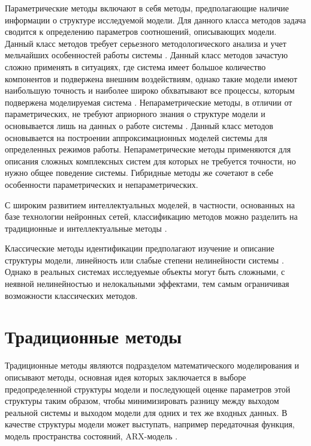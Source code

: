 Параметрические методы включают в себя методы, предполагающие наличие
информации о структуре исследуемой модели. Для данного класса методов задача
сводится к определению параметров соотношений, описывающих модели. Данный класс
методов требует серьезного методологического анализа и учет мельчайших
особенностей работы системы \cite{bib:ident:simulation}. Данный класс методов
зачастую сложно применять в
ситуациях, где система имеет большое количество компонентов и подвержена
внешним воздействиям, однако такие модели имеют наибольшую точность и наиболее
широко обхватывают все процессы, которым подвержена моделируемая система
\cite{bib:ident:model:klassif}. Непараметрические методы, в отличии от параметрических,
не требуют априорного знания о структуре модели и основывается лишь на данных о
работе системы \cite{bib:ident:arrays}. Данный класс методов основывается на построении
аппроксимационных моделей системы для определенных режимов работы.
Непараметрические методы применяются для описания сложных комплексных систем
для которых не требуется точности, но нужно общее поведение системы. Гибридные
методы же сочетают в себе особенности параметрических и непараметрических. 

С широким развитием интеллектуальных моделей, в частности, основанных на базе
технологии нейронных сетей, классификацию методов можно разделить на
традиционные и интеллектуальные методы \cite{bib:ident:neural:modelling}.

Классические методы идентификации предполагают изучение и описание структуры
модели, линейность или слабые степени нелинейности системы
\cite{bib:sim:topic-based}. Однако в реальных системах исследуемые объекты
могут быть сложными, с неявной нелинейностью и нелокальными эффектами, тем
самым ограничивая возможности классических методов. 

\section{Традиционные методы}

Традиционные методы являются подразделом математического моделирования и
описывают методы, основная идея которых заключается в выборе предопределенной
структуры модели и последующей оценке
параметров этой структуры таким образом, чтобы минимизировать разницу между
выходом реальной системы и выходом модели для одних и тех же входных данных.
В качестве структуры модели может выступать, например передаточная функция,
модель пространства состояний, ARX-модель . 

